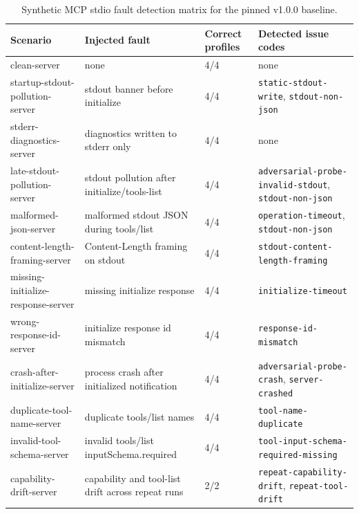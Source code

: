 \begin{table}[t]
\centering
\small
\caption{Synthetic MCP stdio fault detection matrix for the pinned v1.0.0 baseline.}
\label{tab:detection-matrix}
\begin{tabularx}{\textwidth}{p{}p{}p{}X}
\toprule
Scenario & Injected fault & Correct profiles & Detected issue codes \\
\midrule
clean-server & none & 4/4 & none \\
startup-stdout-pollution-server & stdout banner before initialize & 4/4 & \texttt{static-stdout-write}, \texttt{stdout-non-json} \\
stderr-diagnostics-server & diagnostics written to stderr only & 4/4 & none \\
late-stdout-pollution-server & stdout pollution after initialize/tools-list & 4/4 & \texttt{adversarial-probe-invalid-stdout}, \texttt{stdout-non-json} \\
malformed-json-server & malformed stdout JSON during tools/list & 4/4 & \texttt{operation-timeout}, \texttt{stdout-non-json} \\
content-length-framing-server & Content-Length framing on stdout & 4/4 & \texttt{stdout-content-length-framing} \\
missing-initialize-response-server & missing initialize response & 4/4 & \texttt{initialize-timeout} \\
wrong-response-id-server & initialize response id mismatch & 4/4 & \texttt{response-id-mismatch} \\
crash-after-initialize-server & process crash after initialized notification & 4/4 & \texttt{adversarial-probe-crash}, \texttt{server-crashed} \\
duplicate-tool-name-server & duplicate tools/list names & 4/4 & \texttt{tool-name-duplicate} \\
invalid-tool-schema-server & invalid tools/list inputSchema.required & 4/4 & \texttt{tool-input-schema-required-missing} \\
capability-drift-server & capability and tool-list drift across repeat runs & 2/2 & \texttt{repeat-capability-drift}, \texttt{repeat-tool-drift} \\
\bottomrule
\end{tabularx}
\end{table}
